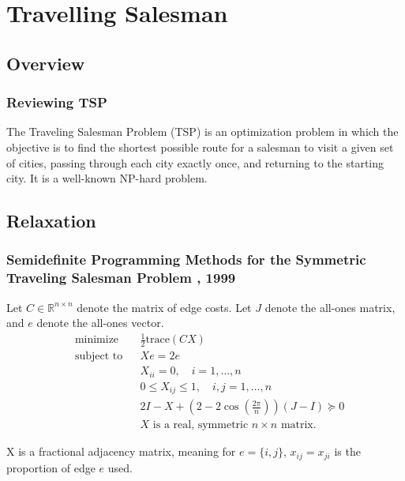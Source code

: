\documentclass[
	11pt, %
]{beamer}
\begin{document}
\section{Travelling Salesman}
\subsection{Overview}

\begin{frame}
    \frametitle{Reviewing TSP}
    The Traveling Salesman Problem (TSP) is an optimization problem in which the objective is to find the shortest possible route for a salesman to visit a given set of cities, passing through each city exactly once, and returning to the starting city. It is a well-known NP-hard problem.
\end{frame}

\subsection{Relaxation}
\begin{frame}
\frametitle{Semidefinite Programming Methods for the Symmetric Traveling Salesman Problem
, 1999}
Let $C \in \mathbb{R}^{n \times n}$ denote the matrix of edge costs. Let $J$ denote the all-ones matrix, and $e$ denote the all-ones vector.
\begin{equation*}
\begin{aligned}
& {\text{minimize}}
& & \frac{1}{2}\text{trace}(CX) \\
& \text{subject to}
& & Xe = 2e \\
&&& X_{ii} = 0, \quad i = 1,\ldots,n\\
&&& 0 \leq X_{ij} \leq 1, \quad i,j = 1,\ldots,n \\
&&& 2I - X + (2-2\cos\left(\frac{2\pi}{n}\right))(J-I) \succeq 0 \\
&&& X \text{ is a real, symmetric } n \times n \text{ matrix}.
\end{aligned}
\end{equation*}

\noindent X is a fractional adjacency matrix, meaning for $e = \{i, j\}$, $x_{ij} = x_{ji}$ is the proportion of edge $e$ used.
\end{frame}
\end{document}
